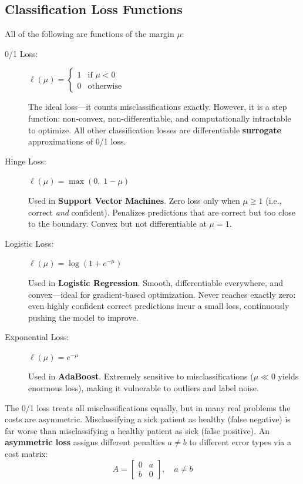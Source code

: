 \subsection*{Classification Loss Functions}

All of the following are functions of the margin $\mu$:

\begin{description}
    \item[0/1 Loss:] $\ell(\mu) = \begin{cases} 1 & \text{if } \mu < 0 \\ 0 & \text{otherwise}\end{cases}$

    The ideal loss---it counts misclassifications exactly. However, it is a step function: non-convex, non-differentiable, and computationally intractable to optimize. All other classification losses are differentiable \textbf{surrogate} approximations of 0/1 loss.

    \item[Hinge Loss:] $\ell(\mu) = \max(0,\; 1 - \mu)$

    Used in \textbf{Support Vector Machines}. Zero loss only when $\mu \geq 1$ (i.e., correct \textit{and} confident). Penalizes predictions that are correct but too close to the boundary. Convex but not differentiable at $\mu = 1$.

    \item[Logistic Loss:] $\ell(\mu) = \log(1 + e^{-\mu})$

    Used in \textbf{Logistic Regression}. Smooth, differentiable everywhere, and convex---ideal for gradient-based optimization. Never reaches exactly zero: even highly confident correct predictions incur a small loss, continuously pushing the model to improve.

    \item[Exponential Loss:] $\ell(\mu) = e^{-\mu}$

    Used in \textbf{AdaBoost}. Extremely sensitive to misclassifications ($\mu \ll 0$ yields enormous loss), making it vulnerable to outliers and label noise.
\end{description}

\begin{remark}
The 0/1 loss treats all misclassifications equally, but in many real problems the costs are asymmetric. Misclassifying a sick patient as healthy (false negative) is far worse than misclassifying a healthy patient as sick (false positive). An \textbf{asymmetric loss} assigns different penalties $a \neq b$ to different error types via a cost matrix:
$$A = \begin{bmatrix} 0 & a \\ b & 0 \end{bmatrix}, \quad a \neq b$$
\end{remark}

